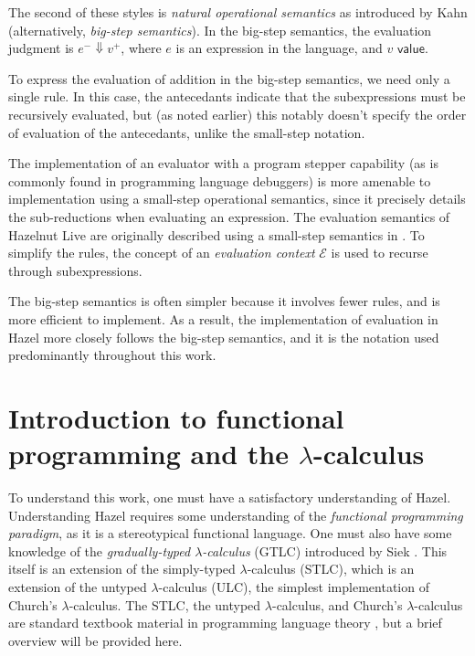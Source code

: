The second of these styles is \textit{natural operational semantics} as introduced by Kahn \cite{Kahn1987NaturalS} (alternatively, \textit{big-step semantics}). In the big-step semantics, the evaluation judgment is $e^-\Downarrow v^+$, where $e$ is an expression in the language, and $v\textsf{ value}$.

To express the evaluation of addition in the big-step semantics, we need only a single rule. In this case, the antecedants indicate that the subexpressions must be recursively evaluated, but (as noted earlier) this notably doesn't specify the order of evaluation of the antecedants, unlike the small-step notation.

\begin{singlespace}
  \begin{mathpar}
  \end{mathpar}
\end{singlespace}

The implementation of an evaluator with a program stepper capability (as is commonly found in programming language debuggers) is more amenable to implementation using a small-step operational semantics, since it precisely details the sub-reductions when evaluating an expression. The evaluation semantics of Hazelnut Live are originally described using a small-step semantics in \cite{conf/popl/HazelnutLive19}. To simplify the rules, the concept of an \textit{evaluation context} $\mathcal{E}$ is used to recurse through subexpressions.

The big-step semantics is often simpler because it involves fewer rules, and is more efficient to implement. As a result, the implementation of evaluation in Hazel more closely follows the big-step semantics, and it is the notation used predominantly throughout this work.

\section{Introduction to functional programming and the $\lambda$-calculus}
\label{sec:fp-lc}

To understand this work, one must have a satisfactory understanding of Hazel. Understanding Hazel requires some understanding of the \textit{functional programming paradigm}, as it is a stereotypical functional language. One must also have some knowledge of the \textit{gradually-typed $\lambda$-calculus} (GTLC) introduced by Siek \cite{Siek06gradualtyping,siek2015refined}. This itself is an extension of the simply-typed $\lambda$-calculus (STLC), which is an extension of the untyped $\lambda$-calculus (ULC), the simplest implementation of Church's $\lambda$-calculus. The STLC, the untyped $\lambda$-calculus, and Church's $\lambda$-calculus are standard textbook material in programming language theory \cite{harper2016practical}, but a brief overview will be provided here.

